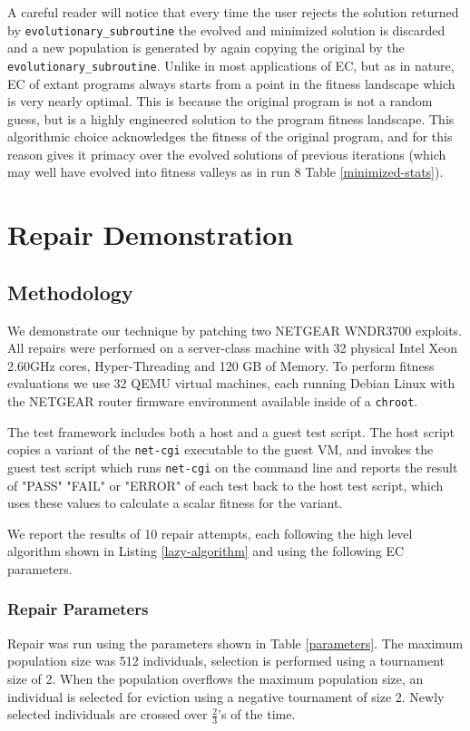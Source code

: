 \documentclass{sigcomm-alternate}
\begin{document}
A careful reader will notice that every time the user rejects the
solution returned by \texttt{evolutionary\_subroutine} the evolved and
minimized solution is discarded and a new population is generated by
again copying the original by the \texttt{evolutionary\_subroutine}.  Unlike
in most applications of EC, but as in nature, EC of extant programs
always starts from a point in the fitness landscape which is very
nearly optimal.  This is because the original program is not a random
guess, but is a highly engineered solution to the program fitness
landscape.  This algorithmic choice acknowledges the fitness of the
original program, and for this reason gives it primacy over the
evolved solutions of previous iterations (which may well have evolved
into fitness valleys as in run 8 Table \ref{minimized-stats}).

\section{Repair Demonstration}
\label{sec-4}
\subsection{Methodology}
\label{sec-4-1}
We demonstrate our technique by patching two NETGEAR WNDR3700
exploits.  All repairs were performed on a server-class machine with
32 physical Intel Xeon 2.60GHz cores, Hyper-Threading and 120 GB of
Memory.  To perform fitness evaluations we use 32 QEMU virtual
machines, each running Debian Linux with the NETGEAR router firmware
environment available inside of a \texttt{chroot}.

The test framework includes both a host and a guest test script.  The
host script copies a variant of the \texttt{net-cgi} executable to the guest
VM, and invokes the guest test script which runs \texttt{net-cgi} on the
command line and reports the result of "PASS" "FAIL" or "ERROR" of
each test back to the host test script, which uses these values to
calculate a scalar fitness for the variant.

We report the results of 10 repair attempts, each following the high
level algorithm shown in Listing \ref{lazy-algorithm} and using the
following EC parameters.

\subsubsection{Repair Parameters}
\label{sec-4-1-1}
Repair was run using the parameters shown in Table \ref{parameters}.  The
maximum population size was 512 individuals, selection is performed
using a tournament size of 2.  When the population overflows the
maximum population size, an individual is selected for eviction using
a negative tournament of size 2.  Newly selected individuals are
crossed over $\frac{2}{3}$'s of the time.
\end{document}
